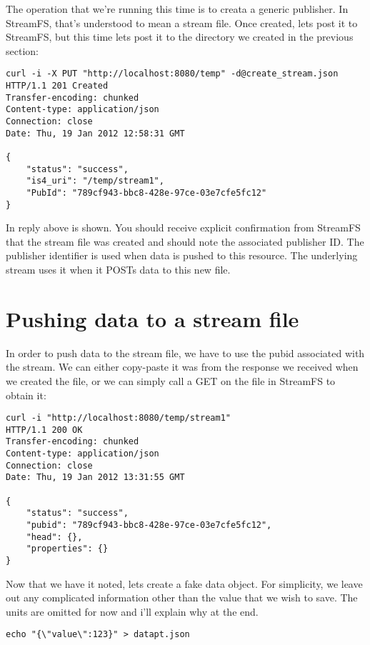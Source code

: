 The operation that we're running this time is to creata a generic publisher. In StreamFS, that's understood to mean a stream file. Once created, lets post it to StreamFS, but this time lets post it to the directory we created in the previous section:

\begin{lstlisting}
curl -i -X PUT "http://localhost:8080/temp" -d@create_stream.json
HTTP/1.1 201 Created
Transfer-encoding: chunked
Content-type: application/json
Connection: close
Date: Thu, 19 Jan 2012 12:58:31 GMT

{
    "status": "success",
    "is4_uri": "/temp/stream1",
    "PubId": "789cf943-bbc8-428e-97ce-03e7cfe5fc12"
}
\end{lstlisting}

In reply above is shown. You should receive explicit confirmation from StreamFS that the stream file was created and should note the associated publisher ID. The publisher identifier is used when data is pushed to this resource. The underlying stream uses it when it POSTs data to this new file.

\section{Pushing data to a stream file}

In order to push data to the stream file, we have to use the pubid associated with the stream. We can either copy-paste it was from the response we received when we created the file, or we can simply call a GET on the file in StreamFS to obtain it:

\begin{lstlisting}
curl -i "http://localhost:8080/temp/stream1"
HTTP/1.1 200 OK
Transfer-encoding: chunked
Content-type: application/json
Connection: close
Date: Thu, 19 Jan 2012 13:31:55 GMT

{
    "status": "success",
    "pubid": "789cf943-bbc8-428e-97ce-03e7cfe5fc12",
    "head": {},
    "properties": {}
}
\end{lstlisting}

Now that we have it noted, lets create a fake data object. For simplicity, we leave out any complicated information other than the value that we wish to save. The units are omitted for now and i'll explain why at the end.

\begin{lstlisting}
echo "{\"value\":123}" > datapt.json
\end{lstlisting}

